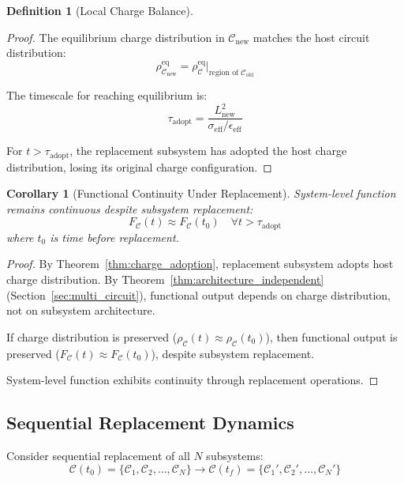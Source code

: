 \documentclass[12pt,a4paper]{article}
\theoremstyle{plain}
\newtheorem{corollary}[theorem]{Corollary}
\theoremstyle{definition}
\newtheorem{definition}[theorem]{Definition}
\theoremstyle{remark}
\begin{document}
\begin{definition}[Local Charge Balance]
\begin{proof}
The equilibrium charge distribution in $\mathcal{C}_{\text{new}}$ matches the host circuit distribution:
\begin{equation}
\rho_{\mathcal{C}_{\text{new}}}^{\text{eq}} = \rho_{\mathcal{C}}^{\text{eq}} \Big|_{\text{region of } \mathcal{C}_{\text{old}}}
\end{equation}

The timescale for reaching equilibrium is:
\begin{equation}
\tau_{\text{adopt}} = \frac{L_{\text{new}}^2}{\sigma_{\text{eff}} / \epsilon_{\text{eff}}}
\end{equation}

For $t > \tau_{\text{adopt}}$, the replacement subsystem has adopted the host charge distribution, losing its original charge configuration.
\end{proof}

\begin{corollary}[Functional Continuity Under Replacement]
\label{cor:functional_continuity}
System-level function remains continuous despite subsystem replacement:
\begin{equation}
F_{\mathcal{C}}(t) \approx F_{\mathcal{C}}(t_0) \quad \forall t > \tau_{\text{adopt}}
\end{equation}
where $t_0$ is time before replacement.
\end{corollary}

\begin{proof}
By Theorem~\ref{thm:charge_adoption}, replacement subsystem adopts host charge distribution. By Theorem~\ref{thm:architecture_independent} (Section~\ref{sec:multi_circuit}), functional output depends on charge distribution, not on subsystem architecture.

If charge distribution is preserved ($\rho_{\mathcal{C}}(t) \approx \rho_{\mathcal{C}}(t_0)$), then functional output is preserved ($F_{\mathcal{C}}(t) \approx F_{\mathcal{C}}(t_0)$), despite subsystem replacement.

System-level function exhibits continuity through replacement operations.
\end{proof}

\subsection{Sequential Replacement Dynamics}

Consider sequential replacement of all $N$ subsystems:
\begin{equation}
\mathcal{C}(t_0) = \{\mathcal{C}_1, \mathcal{C}_2, \ldots, \mathcal{C}_N\} \to \mathcal{C}(t_f) = \{\mathcal{C}_1', \mathcal{C}_2', \ldots, \mathcal{C}_N'\}
\end{equation}


\end{definition}
\end{document}
